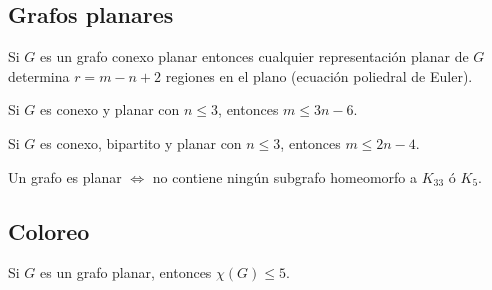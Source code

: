 \subsection{Grafos planares}

\begin{teo}[Euler, 1752]
    Si $G$ es un grafo conexo planar entonces cualquier representación planar de $G$ determina $r = m - n + 2$ regiones en el plano (ecuación poliedral de Euler).
\end{teo}

\begin{lema}
\label{planarMayor3}
    Si $G$ es conexo y planar con $n \leq 3$, entonces $m \leq 3n - 6$.
\end{lema}

\begin{lema}
\label{planarBipartitoMayor3}
    Si $G$ es conexo, bipartito y planar con $n \leq 3$, entonces $m \leq 2n - 4$.
\end{lema}

\begin{teo}[Kuratowski, 1930]
Un grafo es planar $\Longleftrightarrow$ no contiene ningún subgrafo homeomorfo a $K_{33}$ ó $K_5$.
\end{teo}

\subsection{Coloreo}

\begin{teo}[Headwood, 1890]
    Si $G$ es un grafo planar, entonces $\chi(G) \leq 5$.
\end{teo}

